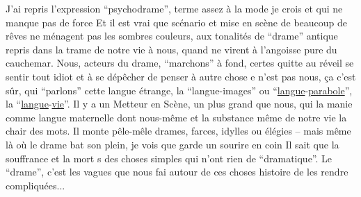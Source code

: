 
J'ai repris  l'expression ``psychodrame'', terme assez à la mode je 
crois\handwritten{,} et qui ne manque pas de force  Et il est vrai que scénario
et mise en scène de beaucoup de rêves
ne ménagent pas les sombres couleurs, aux tonalités 
de  ``drame'' antique  repris dans la trame de notre vie à
nous, quand  ne virent à l'angoisse pure du cauchemar. Nous, acteurs
du drame,  ``marchons'' à fond, certes\handwritten{;} quitte\handwritten{,} au réveil\handwritten{,}   se sentir tout
idiot et à se dépêcher de penser à autre chose\handwritten{!}  e n'est pas nous, ça
c'est sûr, qui ``parlons'' cette langue étrange, la 
``langue-images'' ou ``\uline{langue}-\uline{parabole}'', la ``\uline{langue}-\uline{vie}''. Il y\handwritten{\unsure{,}} a un Metteur
en Scène, un plus grand que nous, qui la manie comme   langue maternelle\handwritten{,}
dont nous-mê\handwritten{\unsure{\^{}}}me et la substance même de notre vie   la chair des
mots. Il monte pêle-mêle drames, farces, idylles ou élégies -- mais même
là où le drame bat son plein, je vois  que   
garde un sourire en coin Il sait que la souffrance et la
mort s des choses  simples\handwritten{,}  qui n'ont rien de ``dramatique''.
 Le ``drame'', c'est les vagues que nous   fai autour de ces choses\handwritten{,}
histoire de  les rendre compliquées...


